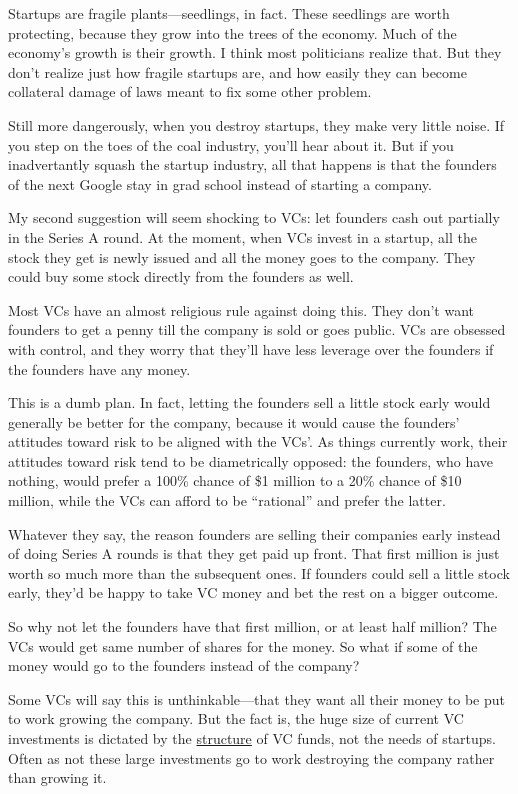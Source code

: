 \documentclass[12pt]{book}
\begin{document}
Startups are fragile plants---seedlings, in fact. These seedlings are
worth protecting, because they grow into the trees of the economy. Much
of the economy's growth is their growth. I think most politicians
realize that. But they don't realize just how fragile startups are, and
how easily they can become collateral damage of laws meant to fix some
other problem.

Still more dangerously, when you destroy startups, they make very little
noise. If you step on the toes of the coal industry, you'll hear about
it. But if you inadvertantly squash the startup industry, all that
happens is that the founders of the next Google stay in grad school
instead of starting a company.

My second suggestion will seem shocking to VCs: let founders cash out
partially in the Series A round. At the moment, when VCs invest in a
startup, all the stock they get is newly issued and all the money goes
to the company. They could buy some stock directly from the founders as
well.

Most VCs have an almost religious rule against doing this. They don't
want founders to get a penny till the company is sold or goes public.
VCs are obsessed with control, and they worry that they'll have less
leverage over the founders if the founders have any money.

This is a dumb plan. In fact, letting the founders sell a little stock
early would generally be better for the company, because it would cause
the founders' attitudes toward risk to be aligned with the VCs'. As
things currently work, their attitudes toward risk tend to be
diametrically opposed: the founders, who have nothing, would prefer a
100\% chance of \$1 million to a 20\% chance of \$10 million, while the
VCs can afford to be ``rational'' and prefer the latter.

Whatever they say, the reason founders are selling their companies early
instead of doing Series A rounds is that they get paid up front. That
first million is just worth so much more than the subsequent ones. If
founders could sell a little stock early, they'd be happy to take VC
money and bet the rest on a bigger outcome.

So why not let the founders have that first million, or at least half
million? The VCs would get same number of shares for the money. So what
if some of the money would go to the founders instead of the company?

Some VCs will say this is unthinkable---that they want all their money
to be put to work growing the company. But the fact is, the huge size of
current VC investments is dictated by the
\href{venturecapital.html}{structure} of VC funds, not the needs of
startups. Often as not these large investments go to work destroying the
company rather than growing it.
\end{document}
